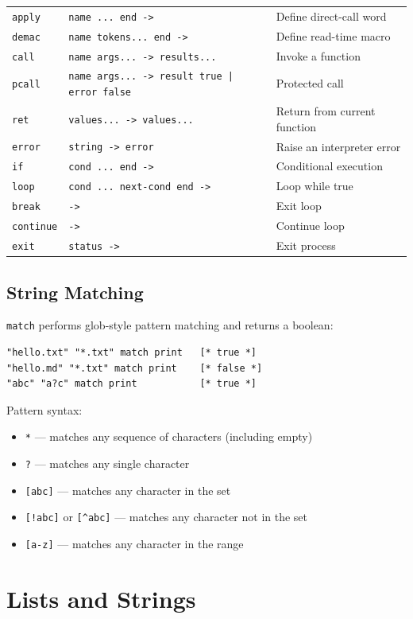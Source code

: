 \documentclass[11pt,a4paper]{article}
\newcommand{\code}[1]{\texttt{#1}}
\begin{document}
\begin{longtable}{lll}
\code{apply} & \code{name ... end ->} & Define direct-call word \\
\code{demac} & \code{name tokens... end ->} & Define read-time macro \\
\code{call} & \code{name args... -> results...} & Invoke a function \\
\code{pcall} & \code{name args... -> result true | error false} & Protected call \\
\code{ret} & \code{values... -> values...} & Return from current function \\
\code{error} & \code{string -> error} & Raise an interpreter error \\
\code{if} & \code{cond ... end ->} & Conditional execution \\
\code{loop} & \code{cond ... next-cond end ->} & Loop while true \\
\code{break} & \code{->} & Exit loop \\
\code{continue} & \code{->} & Continue loop \\
\code{exit} & \code{status ->} & Exit process \\
\bottomrule
\end{longtable}

\subsection{String Matching}

\code{match} performs glob-style pattern matching and returns a boolean:

\begin{lstlisting}[language=Raden]
"hello.txt" "*.txt" match print   [* true *]
"hello.md" "*.txt" match print    [* false *]
"abc" "a?c" match print           [* true *]
\end{lstlisting}

Pattern syntax:
\begin{itemize}
\item \code{*} — matches any sequence of characters (including empty)
\item \code{?} — matches any single character
\item \code{[abc]} — matches any character in the set
\item \code{[!abc]} or \code{[\^{}abc]} — matches any character not in the set
\item \code{[a-z]} — matches any character in the range
\end{itemize}

\section{Lists and Strings}
\end{document}
